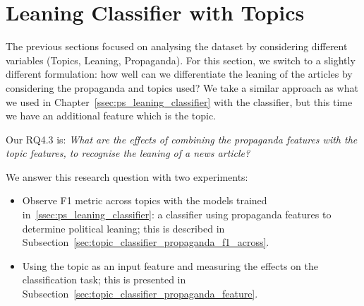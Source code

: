 







\section{\statusgreen Leaning Classifier with Topics}
\label{sec:topic_classifier_propaganda}

The previous sections focused on analysing the dataset by considering different variables (Topics, Leaning, Propaganda).
For this section, we switch to a slightly different formulation: how well can we differentiate the leaning of the articles by considering the propaganda and topics used?
We take a similar approach as what we used in Chapter~\ref{ssec:ps_leaning_classifier} with the classifier, but this time we have an additional feature which is the topic.

Our RQ4.3 is: \emph{What are the effects of combining the propaganda features with the topic
features, to recognise the leaning of a news article?}

We answer this research question with two experiments:

\begin{itemize}
    \item Observe F1 metric across topics with the models trained in~\ref{ssec:ps_leaning_classifier}: a classifier using propaganda features to determine political leaning; this is described in Subsection~\ref{sec:topic_classifier_propaganda_f1_across}.
    \item Using the topic as an input feature and measuring the effects on the classification task; this is presented in Subsection~\ref{sec:topic_classifier_propaganda_feature}.
\end{itemize}



